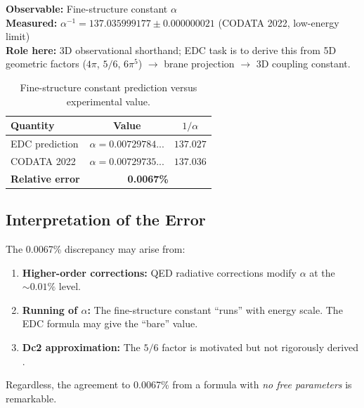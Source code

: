 \begin{tcolorbox}[colback=brown!5!white, colframe=brown!50!black,
    title=\textbf{3D Baseline (empirical)} \tagBL{}]
\textbf{Observable:} Fine-structure constant $\alpha$\\
\textbf{Measured:} $\alpha^{-1} = 137.035999177 \pm 0.000000021$ (CODATA 2022, low-energy limit)\\
\textbf{Role here:} 3D observational shorthand; EDC task is to derive this from
5D geometric factors ($4\pi$, $5/6$, $6\pi^5$) $\to$ brane projection $\to$ 3D coupling constant.
\end{tcolorbox}

\begin{table}[H]
\centering
\begin{tabular}{lcc}
\toprule
\textbf{Quantity} & \textbf{Value} & \textbf{$1/\alpha$} \\
\midrule
EDC prediction & $\alpha = 0.00729784...$ & $137.027$ \\
CODATA 2022 & $\alpha = 0.00729735...$ & $137.036$ \\
\midrule
\textbf{Relative error} & \multicolumn{2}{c}{\textbf{0.0067\%}} \\
\bottomrule
\end{tabular}
\caption{Fine-structure constant prediction versus experimental value.}
\label{tab:ch2_alpha}
\end{table}

\subsection{Interpretation of the Error}

The 0.0067\% discrepancy may arise from:
\begin{enumerate}
    \item \textbf{Higher-order corrections:} QED radiative corrections modify $\alpha$ at the $\sim 0.01\%$ level.
    \item \textbf{Running of $\alpha$:} The fine-structure constant ``runs'' with energy scale.
          The EDC formula may give the ``bare'' value.
    \item \textbf{Dc2 approximation:} The $5/6$ factor is motivated but not rigorously derived \tagP{}.
\end{enumerate}

Regardless, the agreement to 0.0067\% from a formula with \emph{no free parameters} is remarkable.


